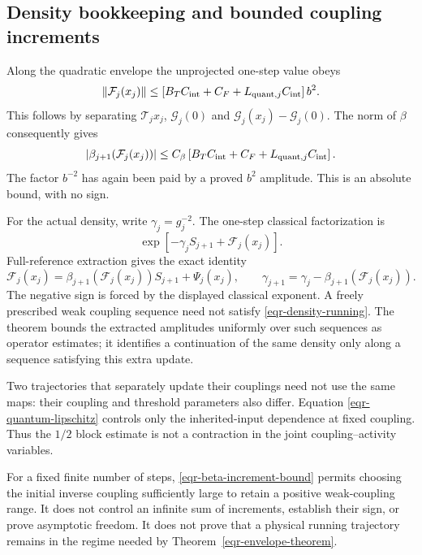 \subsection{Density bookkeeping and bounded coupling increments}
\label{eqr-coupling-section}

Along the quadratic envelope the unprojected one-step value obeys
\begin{equation}
 \|\mathcal F_j(x_j)\|
 \le \left[B_TC_{\rm int}+C_F
                       +L_{{\rm quant},j}C_{\rm int}\right]b^2.
 \label{eqr-unprojected-size}
\end{equation}
This follows by separating $\mathcal T_jx_j$,
$\mathcal G_j(0)$ and
$\mathcal G_j(x_j)-\mathcal G_j(0)$.
The norm of $\beta$ consequently gives
\begin{equation}
 |\beta_{j+1}(\mathcal F_j(x_j))|
 \le C_\beta\left[B_TC_{\rm int}+C_F
                       +L_{{\rm quant},j}C_{\rm int}\right].
 \label{eqr-beta-increment-bound}
\end{equation}
The factor $b^{-2}$ has again been paid by a proved $b^2$
amplitude. This is an absolute bound, with no sign.

For the actual density, write $\gamma_j=g_j^{-2}$. The
one-step classical factorization is
\[
        \exp[-\gamma_j S_{j+1}+\mathcal F_j(x_j)].
\]
Full-reference extraction gives the exact identity
\begin{equation}
 \mathcal F_j(x_j)
  =\beta_{j+1}(\mathcal F_j(x_j))S_{j+1}+\Psi_j(x_j),
 \qquad
 \gamma_{j+1}
  =\gamma_j-\beta_{j+1}(\mathcal F_j(x_j)).
 \label{eqr-density-running}
\end{equation}
The negative sign is forced by the displayed classical exponent.
A freely prescribed weak coupling sequence need not satisfy
\eqref{eqr-density-running}. The theorem bounds the extracted
amplitudes uniformly over such sequences as operator estimates;
it identifies a continuation of the same density only along
a sequence satisfying this extra update.

Two trajectories that separately update their couplings need
not use the same maps: their coupling and threshold parameters
also differ. Equation \eqref{eqr-quantum-lipschitz} controls only
the inherited-input dependence at fixed coupling. Thus the
$1/2$ block estimate is not a contraction in the joint
coupling--activity variables.

For a fixed finite number of steps,
\eqref{eqr-beta-increment-bound} permits choosing the initial
inverse coupling sufficiently large to retain a positive
weak-coupling range. It does not control an infinite sum of
increments, establish their sign, or prove asymptotic freedom.
It does not prove that a physical running trajectory remains
in the regime needed by Theorem~\ref{eqr-envelope-theorem}.

